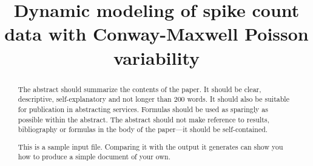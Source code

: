 \documentclass[aoas]{imsart}
\theoremstyle{plain}
\theoremstyle{remark}
\begin{document}
\begin{frontmatter}
\title{Dynamic modeling of spike count data with Conway-Maxwell Poisson variability}


\begin{abstract}
The abstract should summarize the contents of the paper.
It should be clear, descriptive, self-explanatory and not longer
than 200 words. It should also be suitable for publication in
abstracting services. Formulas should be used as sparingly as
possible within the abstract. The abstract should not make
reference to results, bibliography or formulas in the body
of the paper---it should be self-contained.

This is a sample input file.  Comparing it with the output it
generates can show you how to produce a simple document of
your own.
\end{abstract}

\begin{keyword}
\end{keyword}

\end{frontmatter}
\end{document}
